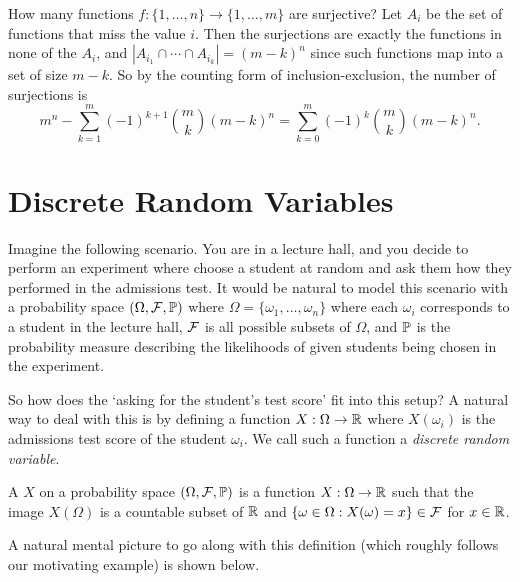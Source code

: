 \documentclass[a4paper]{scrartcl}
\begin{document}
\begin{example}
	How many functions $f : \{1, \dots, n\} \rightarrow \{1, \dots, m\}$ are surjective? Let $A_i$ be the set of functions that miss the value $i$. Then the surjections are exactly the functions in none of the $A_i$, and $|A_{i_1} \cap \cdots \cap A_{i_k}| = (m - k)^n$ since such functions map into a set of size $m - k$. So by the counting form of inclusion-exclusion, the number of surjections is
	$$
	m^n - \sum_{k = 1}^{m} (-1)^{k + 1} \binom{m}{k}(m - k)^n = \sum_{k = 0}^{m} (-1)^k \binom{m}{k} (m - k)^n.
	$$
\end{example}


\section{Discrete Random Variables}

Imagine the following scenario. You are in a lecture hall, and you decide to perform an experiment where choose a student at random and ask them how they performed in the admissions test. It would be natural to model this scenario with a probability space $(\Omega, \mathcal{F}, \mathbb{P})$ where $\Omega = \{\omega_1, \dots, \omega_n\}$ where each $\omega_i$ corresponds to a student in the lecture hall, $\mathcal{F}$ is all possible subsets of $\Omega$, and $\mathbb{P}$ is the probability measure describing the likelihoods of given students being chosen in the experiment.

So how does the `asking for the student's test score' fit into this setup? A natural way to deal with this is by defining a function $X : \Omega \rightarrow \mathbb{R}$ where $X(\omega_i)$ is the admissions test score of the student $\omega_i$. We call such a function a \emph{discrete random variable}. 

\begin{definition}
	A  $X$ on a probability space $(\Omega, \mathcal{F}, \mathbb{P})$ is a function $X : \Omega \rightarrow \mathbb{R}$ such that the image $X(\Omega)$ is a countable subset of $\mathbb{R}$ and $\{ \omega \in \Omega : X(\omega) = x \} \in \mathcal{F}$ for $x \in \mathbb{R}$.
\end{definition}

A natural mental picture to go along with this definition (which roughly follows our motivating example) is shown below.
\end{document}
